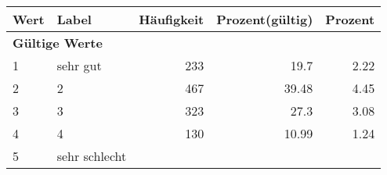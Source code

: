      \begin{longtable}{lXrrr}
     \toprule
     \textbf{Wert} & \textbf{Label} & \textbf{Häufigkeit} & \textbf{Prozent(gültig)} & \textbf{Prozent} \\
     \endhead
     \midrule
     \multicolumn{5}{l}{\textbf{Gültige Werte}}\\

     1 &
     \multicolumn{1}{X}{ sehr gut   } &


       \num{233} &
       \num[round-mode=places,round-precision=2]{19,7} &
         \num[round-mode=places,round-precision=2]{2,22} \\

     2 &
     \multicolumn{1}{X}{ 2   } &


       \num{467} &
       \num[round-mode=places,round-precision=2]{39,48} &
         \num[round-mode=places,round-precision=2]{4,45} \\

     3 &
     \multicolumn{1}{X}{ 3   } &


       \num{323} &
       \num[round-mode=places,round-precision=2]{27,3} &
         \num[round-mode=places,round-precision=2]{3,08} \\

     4 &
     \multicolumn{1}{X}{ 4   } &


       \num{130} &
       \num[round-mode=places,round-precision=2]{10,99} &
         \num[round-mode=places,round-precision=2]{1,24} \\

     5 &
     \multicolumn{1}{X}{ sehr schlecht   } &



\end{longtable}
